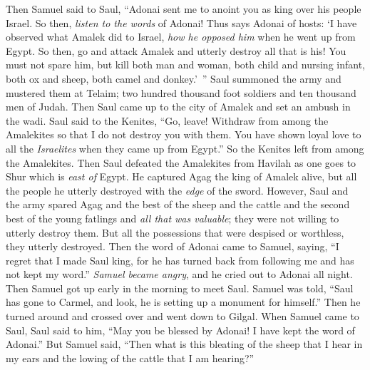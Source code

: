 \begin{biblechapter} %
 Then Samuel said to Saul, “Adonai sent me to anoint you as king over his people Israel. So then, \textit{listen to the words} of Adonai!
\verse Thus says Adonai of hosts: ‘I have observed what Amalek did to Israel, \textit{how he opposed him} when he went up from Egypt.
\verse So then, go and attack Amalek and utterly destroy all that is his! You must not spare him, but kill both man and woman, both child and nursing infant, both ox and sheep, both camel and donkey.’ ”
\verse Saul summoned the army and mustered them at Telaim; two hundred thousand foot soldiers and ten thousand men of Judah.
\verse Then Saul came up to the city of Amalek and set an ambush in the wadi.
\verse Saul said to the Kenites, “Go, leave! Withdraw from among the Amalekites so that I do not destroy you with them. You have shown loyal love to all the \textit{Israelites} when they came up from Egypt.” So the Kenites left from among the Amalekites.
\verse Then Saul defeated the Amalekites from Havilah as one goes to Shur which is \textit{east of} Egypt.
\verse He captured Agag the king of Amalek alive, but all the people he utterly destroyed with the \textit{edge} of the sword.
\verse However, Saul and the army spared Agag and the best of the sheep and the cattle and the second best of the young fatlings and \textit{all that was valuable}; they were not willing to utterly destroy them. But all the possessions that were despised or worthless, they utterly destroyed.
 Then the word of Adonai came to Samuel, saying,
\verse “I regret that I made Saul king, for he has turned back from following me and has not kept my word.” \textit{Samuel became angry}, and he cried out to Adonai all night.
\verse Then Samuel got up early in the morning to meet Saul. Samuel was told, “Saul has gone to Carmel, and look, he is setting up a monument for himself.” Then he turned around and crossed over and went down to Gilgal.
\verse When Samuel came to Saul, Saul said to him, “May you be blessed by Adonai! I have kept the word of Adonai.”
\verse But Samuel said, “Then what is this bleating of the sheep that I hear in my ears and the lowing of the cattle that I am hearing?”

\end{biblechapter}

